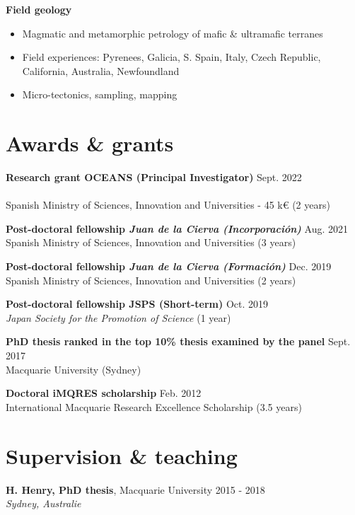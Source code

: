 \documentclass[a4paper,11pt]{article}
\begin{document}
    \textbf{Field geology}
    \begin{itemize}[itemsep=0pt,parsep=2pt]
        \item Magmatic and metamorphic petrology of mafic \& ultramafic terranes
        \item Field experiences: Pyrenees, Galicia, S. Spain, Italy, Czech Republic, California, Australia, Newfoundland
        \item Micro-tectonics, sampling, mapping
    \end{itemize}

\section{Awards \& grants}

    \textbf{Research grant OCEANS (Principal Investigator)}
    \hfill {Sept. 2022}\\
    \\
    Spanish Ministry of Sciences, Innovation and Universities - 45 k€ (2 years)
    
    \textbf{Post-doctoral fellowship \textit{Juan de la Cierva (Incorporación)}}
    \hfill {Aug. 2021}\\
    Spanish Ministry of Sciences, Innovation and Universities (3 years)
    
    \textbf{Post-doctoral fellowship \textit{Juan de la Cierva (Formación)}}
    \hfill {Dec. 2019}\\
    Spanish Ministry of Sciences, Innovation and Universities (2 years)
    
    \textbf{Post-doctoral fellowship JSPS (Short-term)}
    \hfill {Oct. 2019}\\
    \textit{Japan Society for the Promotion of Science} (1 year)
    
    \textbf{PhD thesis ranked in the top 10\% thesis examined by the panel}
    \hfill {Sept. 2017}\\
    Macquarie University (Sydney)
    
    \textbf{Doctoral iMQRES scholarship}
    \hfill {Feb. 2012}\\
    International Macquarie Research Excellence Scholarship (3.5 years)

\section{Supervision \& teaching}
    \textbf{H. Henry, PhD thesis}, Macquarie University
    \hfill {2015 - 2018}\\ 
    \hfill \textit{Sydney, Australie}
\end{document}
